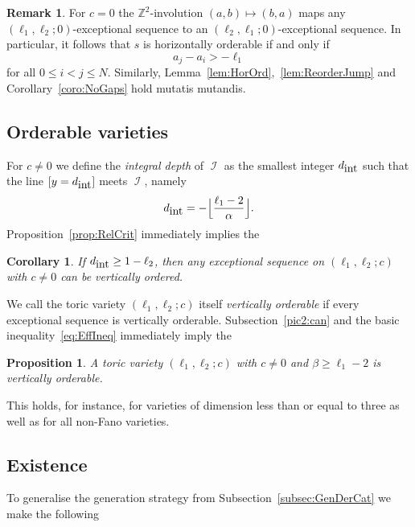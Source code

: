 \documentclass[11pt]{article}
\newtheorem{prop}[theo]{Proposition}
\newtheorem{coro}[theo]{Corollary}
\theoremstyle{definition}
\newtheorem{rema}[theo]{Remark}
\numberwithin{equation}{section}
\newcommand{\Z}{\mathbb Z}
\newcommand{\CI}{{\mathcal I}}
\newcommand{\nImm}{\operatorname{\CI}}
\newcommand{\xa}{\alpha}
\newcommand{\xb}{\beta}
\newcommand{\cl}{s}
\newcommand{\hZ}{d_{\mbox{\rm\tiny int}}}
\newcommand{\ssect}[1]{Subsection~\ref{#1}}
\begin{document}
\begin{rema}
\label{rem:RelProdCase}
For $c=0$ the $\Z^2$-involution $(a,b)\mapsto(b,a)$ 
maps any $(\ell_1,\ell_2;0)$-exceptional sequence 
to an $(\ell_2,\ell_1;0)$-exceptional sequence. In 
particular, it follows that $\cl$ is horizontally 
orderable if and only if
\begin{equation}\label{eq:RelBound2}
a_j-a_i>-\ell_1
\end{equation}
for all $0\leq i<j\leq N$. Similarly,
Lemma~\ref{lem:HorOrd},~\ref{lem:ReorderJump}
and Corollary~\ref{coro:NoGaps}
hold mutatis mutandis.
\end{rema}

\subsection{Orderable varieties}
\label{subsec:RelVar}
For $c\not=0$ we define the {\em integral depth} 
of $\nImm$ as the smallest integer $\hZ$ such that 
the line $[y=\hZ]$ meets $\nImm$, namely
\label{page:IntDepth}
\begin{equation}\label{eq:IntDepth}
\hZ=-\Big\lfloor{\frac{\ell_1-2}{\xa}}\Big\rfloor. 
\end{equation}
Proposition~\ref{prop:RelCrit} immediately 
implies the

\begin{coro}\label{coro:RelVar}
If $\hZ\geq1-\ell_2$, then any exceptional 
sequence on $(\ell_1,\ell_2;c)$ with $c\not=0$ 
can be vertically ordered. 
\end{coro}

We call the toric variety $(\ell_1,\ell_2;c)$ 
itself {\em vertically orderable} if every 
exceptional sequence is vertically orderable. 
\ssect{pic2:can} and the basic inequality~\eqref{eq:EffIneq} 
immediately imply the
 
\begin{prop}
\label{prop:RelVar}
A toric variety $(\ell_1,\ell_2;c)$ with 
$c\not=0$ and $\xb\geq\ell_1-2$ is vertically 
orderable. 
\end{prop}

This holds, for instance, for varieties of 
dimension less than or equal to three 
as well as for all non-Fano varieties. 

\subsection{Existence}
\label{subsec:ExChain}
To generalise the generation strategy 
from \ssect{subsec:GenDerCat} we make 
the following
\end{document}

